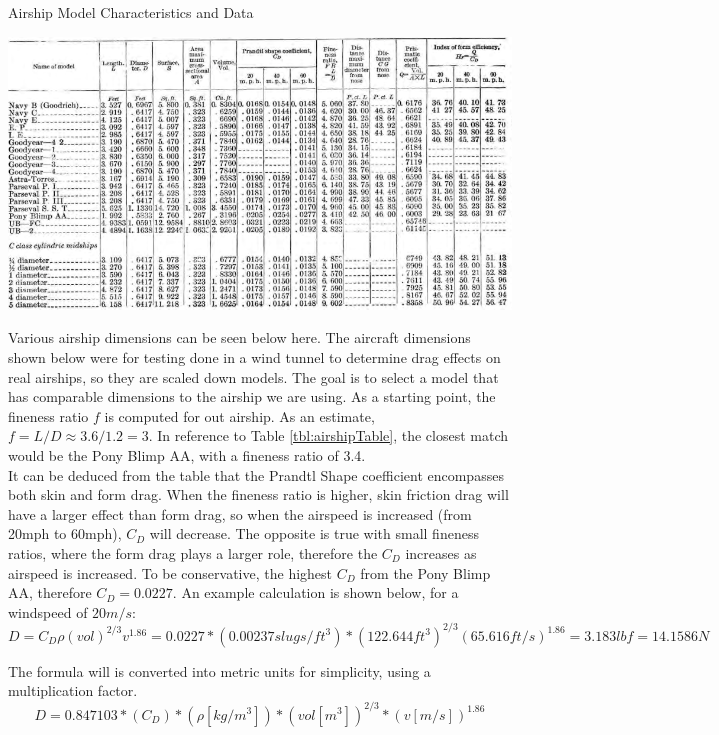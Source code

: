 \documentclass[../main.tex]{subfiles}
\begin{document}
\begin{table}[H]
	\centering
	\caption{Airship Model Characteristics and Data \cite{airshipAerodynamics}}
	\includegraphics[width=\linewidth]{img/drag/airships.PNG}
	\label{tbl:airshipTable}
\end{table}

Various airship dimensions can be seen below here. The aircraft dimensions shown below were for testing done in a wind tunnel to determine drag effects on real airships, so they are scaled down models. The goal is to select a model that has comparable dimensions to the airship we are using. As a starting point, the fineness ratio $f$ is computed for out airship. As an estimate, $f=L/D \approx 3.6/1.2 = 3$. In reference to Table \ref{tbl:airshipTable}, the closest match would be the Pony Blimp AA, with a fineness ratio of 3.4.\\

It can be deduced from the table that the Prandtl Shape coefficient encompasses both skin and form drag. When the fineness ratio is higher, skin friction drag will have a larger effect than form drag, so when the airspeed is increased (from 20mph to 60mph), $C_D$ will decrease. The opposite is true with small fineness ratios, where the form drag plays a larger role, therefore the $C_D$ increases as airspeed is increased. To be conservative, the highest $C_D$ from the Pony Blimp AA, therefore $C_D = 0.0227$. An example calculation is shown below, for a windspeed of $20m/s$:
\begin{equation} \label{exDrag}
D = C_D\rho (vol)^{2/3}v^{1.86}=0.0227*(0.00237 slugs/ft^3)*(122.644 ft^3)^{2/3}(65.616 ft/s) ^{1.86} = 3.183 lbf = 14.1586N 
\end{equation}

The formula will is converted into metric units for simplicity, using a multiplication factor.
\begin{equation}
D = 0.847103*(C_D)*(\rho[kg/m^3])*(vol [m^3])^{2/3}*(v [m/s])^{1.86}
\end{equation}
\end{document}
